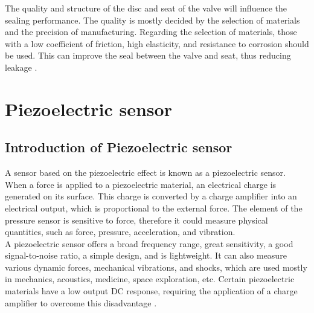 The quality and structure of the disc and seat of the valve will influence the sealing performance. 
The quality is mostly decided by the selection of materials and the precision of manufacturing. 
Regarding the selection of materials, those with a low coefficient of friction, high elasticity, 
and resistance to corrosion should be used. This can improve the seal between the valve and seat, 
thus reducing leakage \cite{causedLeakage}.


\section{Piezoelectric sensor}
\label{sec:PiezoelectricSensor}

\subsection{Introduction of Piezoelectric sensor}
\label{sec:IntroductionOfPiezoelectricSensor}
A sensor based on the piezoelectric effect is known as a piezoelectric sensor. When a force is applied to a piezoelectric material, 
an electrical charge is generated on its surface. This charge is converted by a charge amplifier into an electrical output, 
which is proportional to the external force. The element of the pressure sensor is sensitive to force, 
therefore it could measure physical quantities, such as force, pressure, acceleration, and vibration.\\

A piezoelectric sensor offers a broad frequency range, great sensitivity, a good signal-to-noise ratio, a simple design, and is lightweight. 
It can also measure various dynamic forces, mechanical vibrations, and shocks, which are used mostly in mechanics, acoustics, 
medicine, space exploration, etc. Certain piezoelectric materials have a low output DC response, 
requiring the application of a charge amplifier to overcome this disadvantage \cite{steinem2007}.


